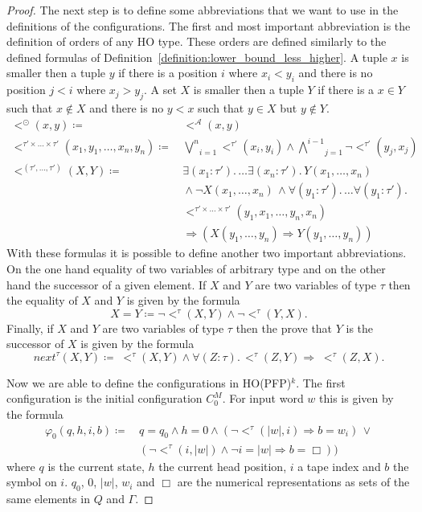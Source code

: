 \begin{proof}
    The next step is to define some abbreviations that we want to use in the definitions of the configurations. The
    first and most important abbreviation is the definition of orders of any HO type. These orders are defined similarly
    to the defined formulas of Definition~\ref{definition:lower_bound_less_higher}. A tuple $x$ is smaller then a tuple $y$ if there is a position $i$ where $x_i < y_i$ and there is no position $j<i$ where $x_j > y_j$. A set $X$ is smaller then a tuple $Y$ if there is a $x \in Y$ such that $x \not\in X$ and there is no $y<x$ such that $y\in X$ but $y\not\in Y$.
    \begin{align*}
        <^\odot(x, y) \coloneqq &\,<^\mathcal{A}(x, y) \\
        <^{\tau' \times \dots \times \tau'}(x_1, y_1, \dots, x_n, y_n) \coloneqq &\,\underset{i =
        1}{\overset{n}{\bigvee}}<^{\tau'}(x_i, y_i) \wedge \underset{j = 1}{\overset{i - 1}{\bigwedge}}
        \neg <^{\tau'}(y_j, x_j)\\
        <^{(\tau', \dots, \tau')}(X, Y) \coloneqq &\,\exists (x_1 \colon {\tau'}). \,\dots \exists(x_n \colon
        {\tau'}).\, Y(x_1, \dots, x_n)
        \\&\,\wedge \neg X(x_1, \dots, x_n)\,\wedge \forall (y_1 \colon {\tau'}). \,\dots
        \forall(y_1 \colon {\tau'}).\,\\&\,<^{\tau'\times \dots \times \tau'}
        (y_1, x_1, \dots, y_n, x_n) \\&\,\Rightarrow (X(y_1, \dots, y_n) \Rightarrow Y(y_1, \dots, y_n))
    \end{align*}
    With these formulas it is possible to define another two important abbreviations. On the one hand equality
    of two variables of arbitrary type and on the other hand the successor of a given element. If $X$ and
    $Y$ are two variables of type $\tau$ then the equality of $X$ and $Y$ is given by the formula
    \[X = Y \coloneqq \neg<^\tau(X, Y) \wedge \neg <^\tau(Y, X).\]
    Finally, if $X$ and $Y$ are two variables of type $\tau$ then the prove that $Y$ is the successor of $X$ is given by
    the formula
    \[next^{\tau}(X, Y) \coloneqq\; <^\tau(X, Y) \wedge \forall (Z \colon \tau).\, <^\tau(Z, Y) \Rightarrow\;<^\tau
    (Z, X).\]

    Now we are able to define the configurations in HO(PFP)$^k$. The first configuration is the initial configuration
    $C_0^M$. For input word $w$ this is given by the formula
    \begin{align*}
        \varphi_0(q, h, i, b) \coloneqq &\,q = q_0 \wedge h = 0 \wedge (\neg <^\tau(|w|, i) \Rightarrow b = w_{i})\,
        \vee\\&\,(\neg <^\tau (i, |w|) \wedge \neg i = |w| \Rightarrow b = \Box))
    \end{align*}
    where $q$ is the current state, $h$ the current head position, $i$ a tape index and $b$ the symbol on $i$. $q_0$,
    $0$, $|w|$, $w_{i}$ and $\Box$ are the numerical representations as sets of the same elements in $Q$ and $\Gamma$.


\end{proof}
